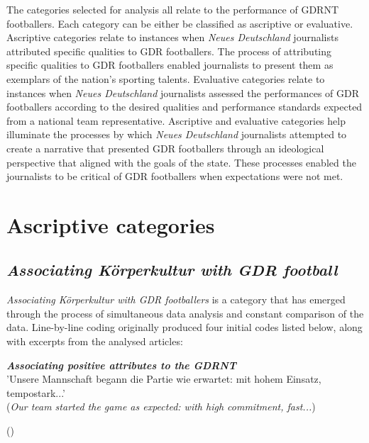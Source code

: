 The categories selected for analysis all relate to the performance of GDRNT footballers. Each category can be either be classified as ascriptive or evaluative. Ascriptive categories relate to instances when \textit{Neues Deutschland} journalists attributed specific qualities to GDR footballers. The process of attributing specific qualities to GDR footballers enabled journalists to present them as exemplars of the nation’s sporting talents.  Evaluative categories relate to instances when \textit{Neues Deutschland} journalists assessed the performances of GDR footballers according to the desired qualities and performance standards expected from a national team representative. Ascriptive and evaluative categories help illuminate the processes by which \textit{Neues Deutschland} journalists attempted to create a narrative that presented GDR footballers through an ideological perspective that aligned with the goals of the state. These processes enabled the journalists to be critical of GDR footballers when expectations were not met.

\section*{Ascriptive categories}

\subsection*{\textit{Associating Körperkultur with GDR football}}

\textit{Associating Körperkultur with GDR footballers} is a category that has emerged through the process of simultaneous data analysis and constant comparison of the data. Line-by-line coding originally produced four initial codes listed below, along with excerpts from the analysed articles:

\begin{displayquote}
\begin{small}
\textbf{\textit{Associating positive attributes to the GDRNT}}\\
'Unsere Mannschaft begann die Partie wie erwartet: mit hohem Einsatz, tempostark...'\\
(\textit{Our team started the game as expected: with high commitment, fast...})\
\begin{flushright}\footnotesize (\cite{nd19740619})\end{flushright}
\end{small}
\end{displayquote}

